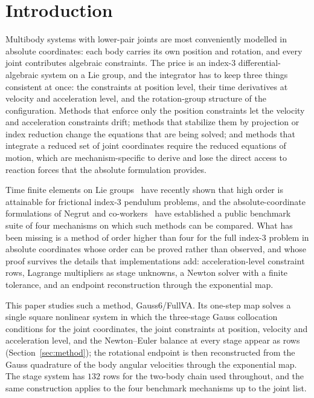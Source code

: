 \documentclass[preprint,12pt]{elsarticle}
\newcommand{\method}{Gauss6\slash FullVA}
\begin{document}
\section{Introduction}
\label{sec:intro}

Multibody systems with lower-pair joints are most conveniently modelled in absolute coordinates:
each body carries its own position and rotation, and every joint contributes algebraic constraints.
The price is an index-3 differential-algebraic system on a Lie group, and the integrator has to keep
three things consistent at once: the constraints at position level, their time derivatives at
velocity and acceleration level, and the rotation-group structure of the configuration. Methods
that enforce only the position constraints let the velocity and acceleration constraints drift;
methods that stabilize them by projection or index reduction change the equations that are being
solved; and methods that integrate a reduced set of joint coordinates require the reduced equations
of motion, which are mechanism-specific to derive and lose the direct access to reaction forces
that the absolute formulation provides.

Time finite elements on Lie groups~\cite{chaturvedi2026tfe} have recently shown that high order is
attainable for frictional index-3 pendulum problems, and the absolute-coordinate formulations of
Negrut and co-workers~\cite{taves2020exponential,kissel2021dwelling,kissel2022absolute,fang2023halfimplicit}
have established a public benchmark suite of four mechanisms on which such methods can be compared.
What has been missing is a method of order higher than four for the full index-3 problem in
absolute coordinates whose order can be proved rather than observed, and whose proof survives the
details that implementations add: acceleration-level constraint rows, Lagrange multipliers as stage
unknowns, a Newton solver with a finite tolerance, and an endpoint reconstruction through the
exponential map.

This paper studies such a method, \method{}. Its one-step map solves a single square nonlinear
system in which the three-stage Gauss collocation conditions for the joint coordinates, the joint
constraints at position, velocity and acceleration level, and the Newton--Euler balance at every
stage appear as rows (Section~\ref{sec:method}); the rotational endpoint is then reconstructed from
the Gauss quadrature of the body angular velocities through the exponential map. The stage system
has $132$ rows for the two-body chain used throughout, and the same construction applies to the
four benchmark mechanisms up to the joint list.
\end{document}
